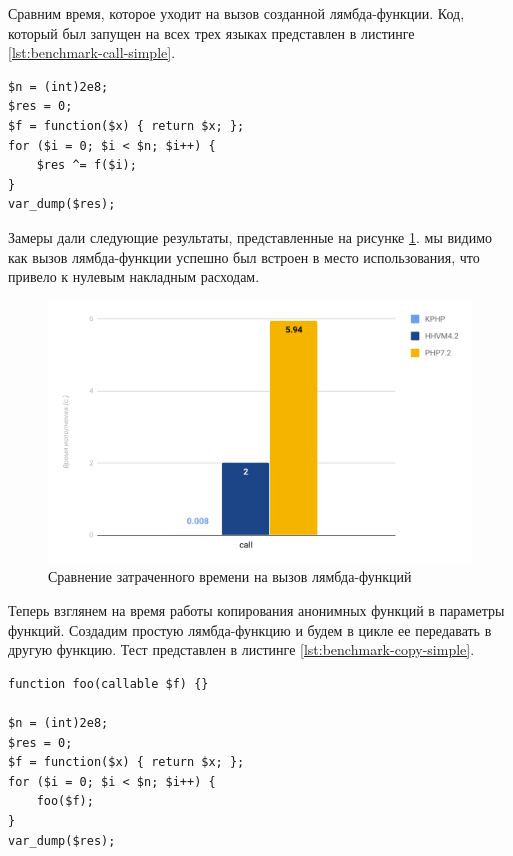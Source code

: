 Сравним время, которое уходит на вызов созданной лямбда-функции.
Код, который был запущен на всех трех языках представлен в листинге \ref{lst:benchmark-call-simple}.
\begin{lstlisting}[caption={Бенчмарк вызовов анонимных функций},label={lst:benchmark-call-simple}]
$n = (int)2e8;
$res = 0;
$f = function($x) { return $x; };
for ($i = 0; $i < $n; $i++) {
    $res ^= f($i);
}
var_dump($res);
\end{lstlisting}

Замеры дали следующие результаты, представленные на рисунке \ref{fig:benchmark-call-simple}.
мы видимо как вызов лямбда-функции успешно был встроен в место использования, что привело к нулевым накладным расходам.
\begin{figure}[H]
    \caption{Сравнение затраченного времени на вызов лямбда-функций}
    \label{fig:benchmark-call-simple}
    \centering
    \includegraphics[width=\linewidth]{images/benchmark_call_simple}
\end{figure}

Теперь взглянем на время работы копирования анонимных функций в параметры функций.
Создадим простую лямбда-функцию и будем в цикле ее передавать в другую функцию.
Тест представлен в листинге \ref{lst:benchmark-copy-simple}.
\begin{lstlisting}[caption={Бенчмарк копирования анонимных функций},label={lst:benchmark-copy-simple}]
function foo(callable $f) {}

$n = (int)2e8;
$res = 0;
$f = function($x) { return $x; };
for ($i = 0; $i < $n; $i++) {
    foo($f);
}
var_dump($res);
\end{lstlisting}

